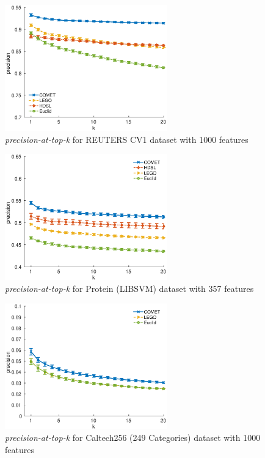 \documentclass{article} %
\begin{document}
\begin{figure}[h]
\centering
\includegraphics[width=7cm]{precision@k_rcv1_4_ig1000}
\caption*{\textit{precision-at-top-k} for REUTERS CV1 dataset with 1000 features}

\end{figure}

\begin{figure}[h]
\centering
\includegraphics[width=7cm]{precision@k_protein}
\caption*{\textit{precision-at-top-k} for Protein (LIBSVM) dataset with 357 features}
\end{figure}

\begin{figure}[h]
\centering
\includegraphics[width=7cm]{precision@k_Caltech256_with_249Categories}
\caption*{\textit{precision-at-top-k} for Caltech256 (249 Categories) dataset with 1000 features}
\end{figure}
\end{document}
